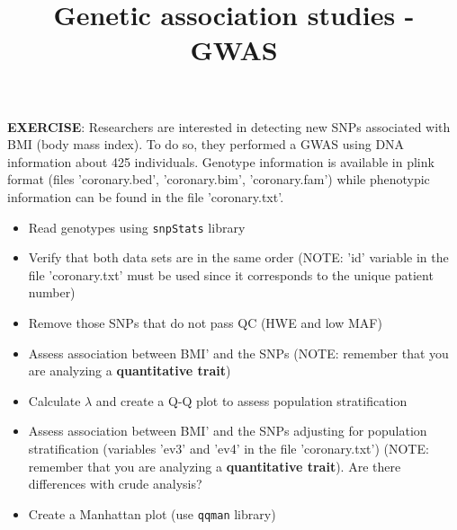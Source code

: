 \documentclass[11pt]{article}
\begin{document}
\title{\bf Genetic association studies - GWAS}
\date{}


\maketitle


\noindent \textbf{EXERCISE}: Researchers are interested in detecting new SNPs associated
with BMI (body mass index). To do so, they performed a GWAS using DNA information about 425 individuals.
Genotype information is available in plink format (files 'coronary.bed', 'coronary.bim', 'coronary.fam')
while phenotypic information can be found in the file 'coronary.txt'.


\begin{itemize}
\item Read genotypes using {\tt snpStats} library
\item Verify that both data sets are in the same order (NOTE: 'id' variable in the file 'coronary.txt' must be
used since it corresponds to the unique patient number)
\item Remove those SNPs that do not pass QC  (HWE and low MAF)
\item Assess association between BMI' and the SNPs  (NOTE: remember that you are analyzing a \textbf{quantitative trait})
\item Calculate $\lambda$ and create a Q-Q plot to assess population stratification
\item Assess association between BMI' and the SNPs adjusting for
population stratification (variables 'ev3' and 'ev4' in the file 'coronary.txt') (NOTE: remember that you are analyzing a \textbf{quantitative trait}). Are there differences with crude analysis?
\item Create a Manhattan plot (use {\tt qqman} library)
\end{itemize}
\end{document}

